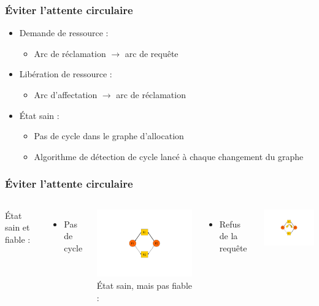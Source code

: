 \begin{frame}
\frametitle{Éviter l’attente circulaire}
\begin{itemize}
\item Demande de ressource :
\begin{itemize}
\item Arc de réclamation $\to$ arc de requête
\end{itemize}
\item Libération de ressource :
\begin{itemize}
\item Arc d’affectation $\to$ arc de réclamation
\end{itemize}
\item <2>État sain :
\begin{itemize}
\item Pas de cycle dans le graphe d’allocation
\item Algorithme de détection de cycle lancé à chaque changement du graphe
\end{itemize}
\end{itemize}
\end{frame}

\begin{frame}
\frametitle{Éviter l’attente circulaire}
\begin{columns}
État sain et fiable :
\begin{itemize}
\item Pas de cycle
\end{itemize}
\includegraphics[width=5cm]{../illustration/ga_pas_cycle.pdf}
État sain, mais pas fiable :
\begin{itemize}
\item Refus de la requête
\end{itemize}
\includegraphics[width=5cm]{../illustration/ga_cycle.pdf}
\end{columns}
\end{frame}

